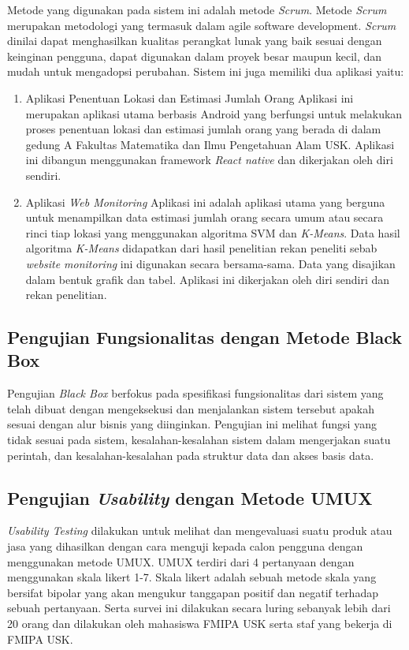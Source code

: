 Metode yang digunakan pada sistem ini adalah metode \textit{Scrum}. Metode \textit{Scrum} merupakan metodologi yang termasuk dalam agile software development. \textit{Scrum} dinilai dapat menghasilkan kualitas perangkat lunak yang baik sesuai dengan keinginan pengguna, dapat digunakan dalam proyek besar maupun kecil, dan mudah untuk mengadopsi perubahan. Sistem ini juga memiliki dua aplikasi yaitu:
\begin{enumerate}
	\item Aplikasi Penentuan Lokasi dan Estimasi Jumlah Orang
	      \newline Aplikasi ini merupakan aplikasi utama berbasis Android yang berfungsi untuk melakukan proses penentuan lokasi dan estimasi jumlah orang yang berada di dalam gedung A Fakultas Matematika dan Ilmu Pengetahuan Alam USK. Aplikasi ini dibangun menggunakan framework \textit{React native} dan dikerjakan oleh diri sendiri.

	\item Aplikasi \textit{Web Monitoring}
	      \newline Aplikasi ini adalah aplikasi utama yang berguna untuk menampilkan data estimasi jumlah orang secara umum atau secara rinci tiap lokasi yang menggunakan algoritma SVM dan \textit{K-Means}. Data hasil algoritma \textit{K-Means} didapatkan dari hasil penelitian rekan peneliti sebab \textit{website monitoring} ini digunakan secara bersama-sama. Data yang disajikan dalam bentuk grafik dan tabel. Aplikasi ini dikerjakan oleh diri sendiri dan rekan penelitian.


\end{enumerate}
\subsection{Pengujian Fungsionalitas dengan Metode Black Box}
\par Pengujian \textit{Black Box} berfokus pada spesifikasi fungsionalitas dari sistem yang telah dibuat dengan mengeksekusi dan menjalankan sistem tersebut apakah sesuai dengan alur bisnis yang diinginkan. Pengujian ini melihat fungsi yang tidak sesuai pada sistem, kesalahan-kesalahan sistem dalam mengerjakan suatu perintah, dan kesalahan-kesalahan pada struktur data dan akses basis data.

\subsection{Pengujian \textit{Usability} dengan Metode UMUX}
\par \textit{Usability Testing} dilakukan untuk melihat dan mengevaluasi suatu produk atau jasa yang dihasilkan dengan cara menguji kepada calon pengguna dengan menggunakan metode UMUX. UMUX terdiri dari 4 pertanyaan dengan menggunakan skala likert 1-7. Skala likert adalah sebuah metode skala yang bersifat bipolar yang akan mengukur tanggapan positif dan negatif terhadap sebuah pertanyaan. Serta survei ini dilakukan secara luring sebanyak lebih dari 20 orang dan dilakukan oleh mahasiswa FMIPA USK serta staf yang bekerja di FMIPA USK.


